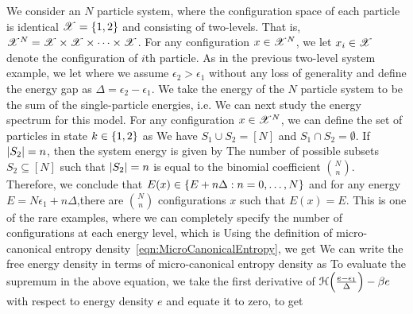 \documentclass[letterpaper,english,10pt]{article}
\begin{document}
\begin{shaded*} 
\begin{exmp}
We consider an $N$ particle system, 
where the configuration space of each particle is identical $\mathscr{X} = \left\{1,2\right\}$ and consisting of two-levels. 
That is, $\mathscr{X}^N = \mathscr{X} \times \mathscr{X}  \times \dots \times \mathscr{X}$. 
For any configuration $x \in \mathscr{X}^N$, we let $x_i \in \mathscr{X}$ denote the configuration of $i$th particle. 
As in the previous two-level system example, we let 
where we assume $\epsilon_2 > \epsilon_1$ without any loss of generality and define the energy gap as $\Delta = \epsilon_2 - \epsilon_1$. 
We take the energy of the $N$ particle system to be the sum of the single-particle energies, i.e. 
We can next study the energy spectrum for this model. 
For any configuration $x \in \mathscr{X}^N$, we can define the set of particles in state $k \in \left\{1,2\right\}$ as 
We have $S_1 \cup S_2 = [N]$ and $S_1 \cap S_2 = \emptyset$. 
If $\left\lvert S_2\right\rvert = n$, then the system energy is given by 
The number of possible subsets $S_2 \subseteq [N]$ such that $\left\lvert S_2\right\rvert = n$ is equal to the binomial coefficient $\binom{N}{n}$. 
Therefore, we conclude that $E(x) \in \left\{E+n\Delta: n = 0, \dots, N\right\}$ and for any energy $E = N \epsilon_1 + n\Delta$,there are $\binom{N}{n}$ configurations $x$ such that $E(x) = E$. 
This is one of the rare examples, where we can completely specify the number of configurations at each energy level, which is 
Using the definition of micro-canonical entropy density~\eqref{eqn:MicroCanonicalEntropy}, we get
We can write the free energy density in terms of micro-canonical entropy density as 
To evaluate the supremum in the above equation, 
we take the first derivative of $\mathcal{H}\Big(\frac{e-\epsilon_1}{\Delta}\Big)  -\beta e$ with respect to energy density $e$ and equate it to zero, to get 

\end{exmp}
\end{shaded*}
\end{document}

